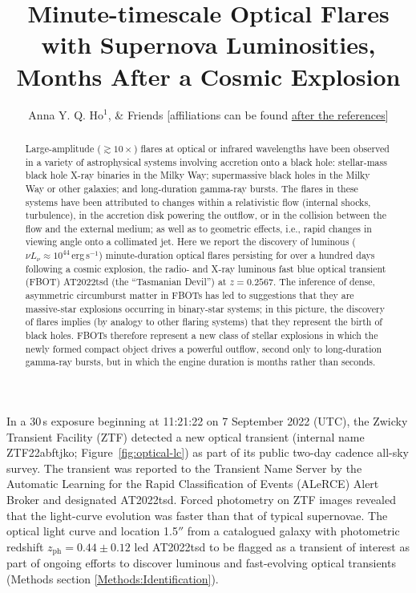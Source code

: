 \documentclass{nature_plusfigure}
\title{Minute-timescale Optical Flares with Supernova Luminosities, Months After a Cosmic Explosion}
\author{Anna Y. Q. Ho$^{1}$,
\& Friends
[affiliations can be found \hyperref[sec:affiliations]{after the references}]
	}
\begin{document}
\maketitle

\begin{abstract}

Large-amplitude ($\gtrsim10\times$) flares at optical or infrared wavelengths have been observed in a variety of astrophysical systems involving accretion onto a black hole: stellar-mass black hole X-ray binaries in the Milky Way\cite{Fender1997}; supermassive black holes in the Milky Way\cite{Marrone2008} or other galaxies\cite{Nesci2021}; and long-duration gamma-ray bursts\cite{Racusin2008}. The flares in these systems have been attributed to changes within a relativistic flow (internal shocks, turbulence), in the accretion disk powering the outflow, or in the collision between the flow and the external medium; as well as to geometric effects, i.e., rapid changes in viewing angle onto a collimated jet. Here we report the discovery of luminous ($\nu L_\nu \approx 10^{44}\,$erg\,s$^{-1}$) minute-duration optical flares persisting for over a hundred days following a cosmic explosion, the radio- and X-ray luminous fast blue optical transient (FBOT) AT2022tsd (the ``Tasmanian Devil'') at $z=0.2567$. The inference of dense\cite{Ho2019,Coppejans2020}, asymmetric\cite{Margutti2019,Maund2023} circumburst matter in FBOTs has led to suggestions that they are massive-star explosions occurring in binary-star systems\cite{Metzger2022}; in this picture, the discovery of flares implies (by analogy to other flaring systems) that they represent the birth of black holes. FBOTs therefore represent a new class of stellar explosions in which the newly formed compact object drives a powerful outflow, second only to long-duration gamma-ray bursts, but in which the engine duration is months rather than seconds.

\end{abstract}

In a 30\,s exposure beginning at 11:21:22 on 7 September 2022 (UTC), the Zwicky Transient Facility (ZTF\cite{Graham2019,Bellm2019}) detected a new optical transient (internal name ZTF22abftjko; Figure~\ref{fig:optical-lc}) as part of its public two-day cadence all-sky survey.
The transient was reported\cite{Munoz-Arancibia2022} to the Transient Name Server by the Automatic Learning for the Rapid Classification of Events (ALeRCE) Alert Broker\cite{Forster2021} and designated AT2022tsd.
Forced photometry on ZTF images\cite{Masci2019} revealed that the light-curve evolution was faster than that of typical supernovae.
The optical light curve and location 1.5$''$ from a catalogued\cite{Beck2021} galaxy with photometric redshift $z_\mathrm{ph}=0.44\pm0.12$ led AT2022tsd to be flagged as a transient of interest as part of ongoing efforts to discover luminous and fast-evolving optical transients (Methods section \ref{Methods:Identification}).
\end{document}

